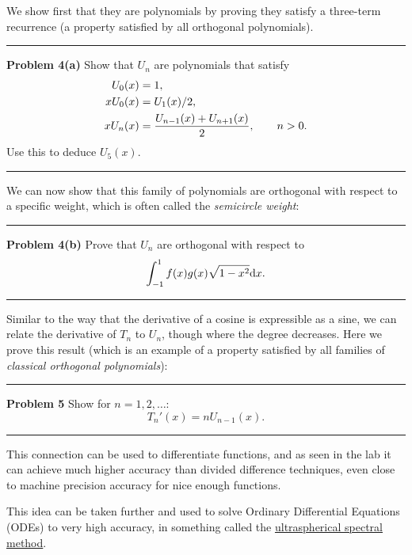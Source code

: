 \documentclass[12pt,a4paper]{article}
\begin{document}
We show first  that they are polynomials by proving they satisfy a three-term recurrence (a property satisfied by all orthogonal polynomials).

\rule{\textwidth}{1pt}
\textbf{Problem 4(a)} Show that $U_n$ are polynomials that satisfy
\begin{align*}
U_0(x) &= 1, \\
x U_0(x) &= U_1(x)/2, \\
x U_n(x) &= {U_{n-1}(x)+U_{n+1}(x) \over 2}, \qquad n > 0.
\end{align*}
Use this to deduce $U_5(x)$.

\rule{\textwidth}{1pt}
We can now show that this family of polynomials are orthogonal with respect to a specific weight, which is often called the \emph{semicircle weight}:

\rule{\textwidth}{1pt}
\textbf{Problem 4(b)} Prove that $U_n$ are orthogonal  with respect to
\[
\int_{-1}^1 f(x) g(x) \sqrt{1-x^2} {\rm d} x.
\]
\rule{\textwidth}{1pt}
Similar to the way that the derivative of a cosine is expressible as a sine, we can relate the derivative of $T_n$ to $U_n$, though where the degree decreases.  Here we prove this result (which is an example of a property satisfied by all families of \emph{classical orthogonal polynomials}):

\rule{\textwidth}{1pt}
\textbf{Problem 5}  Show for $n = 1, 2, \ensuremath{\ldots}$:
\[
T_n'(x) = n U_{n-1}(x).
\]
\rule{\textwidth}{1pt}
This connection can be used to differentiate functions, and as seen in the lab it can achieve much higher accuracy than divided difference techniques, even close to machine precision accuracy for nice enough functions.

This idea can be taken further and used to solve Ordinary Differential Equations (ODEs) to very high accuracy, in something called the \href{https://epubs.siam.org/doi/10.1137/120865458}{ultraspherical spectral method}.
\end{document}
